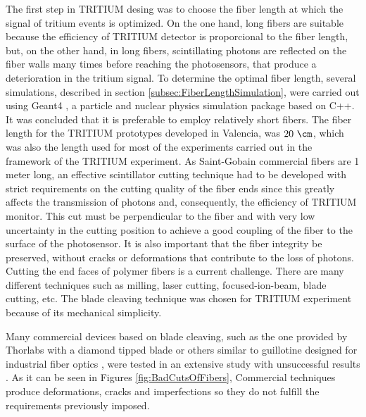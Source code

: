 The first step in TRITIUM desing was to choose the fiber length at which the signal of tritium events is optimized. On the one hand, long fibers are suitable because the efficiency of TRITIUM detector is proporcional to the fiber length, but, on the other hand, in long fibers, scintillating photons are reflected on the fiber walls many times before reaching the photosensors, that produce a deterioration in the tritium signal. To determine the optimal fiber length, several simulations, described in section \ref{subsec:FiberLengthSimulation}, were carried out using Geant4 \cite{Geant4WebPage}, a particle and nuclear physics simulation package based on C++. It was concluded that it is preferable to employ relatively short fibers. The fiber length for the TRITIUM prototypes developed in Valencia, was $20~\cm$, which was also the length used for most of the experiments carried out in the framework of the TRITIUM experiment. As Saint-Gobain commercial fibers are 1 meter long, an effective scintillator cutting technique had to be developed with strict requirements on the cutting quality of the fiber ends since this greatly affects the transmission of photons and, consequently, the efficiency of TRITIUM monitor. This cut must be perpendicular to the fiber and with very low uncertainty in the cutting position to achieve a good coupling of the fiber to the surface of the photosensor. It is also important that the fiber integrity be preserved, without cracks or deformations that contribute to the loss of photons. Cutting the end faces of polymer fibers is a current challenge. There are many different techniques such as milling, laser cutting, focused-ion-beam, blade cutting, etc. The blade cleaving technique was chosen for TRITIUM experiment because of its mechanical simplicity. %

Many commercial devices based on blade cleaving, such as the one provided by Thorlabs with a diamond tipped blade \cite{DiamondThorlabs} or others similar to guillotine designed for industrial fiber optics \cite{GuillotineIFO}, were tested in an extensive study with unsuccessful results \cite{TFGAlberto}. As it can be seen in Figures \ref{fig:BadCutsOfFibers}, Commercial techniques produce deformations, cracks and imperfections so they do not fulfill the requirements previously imposed.


